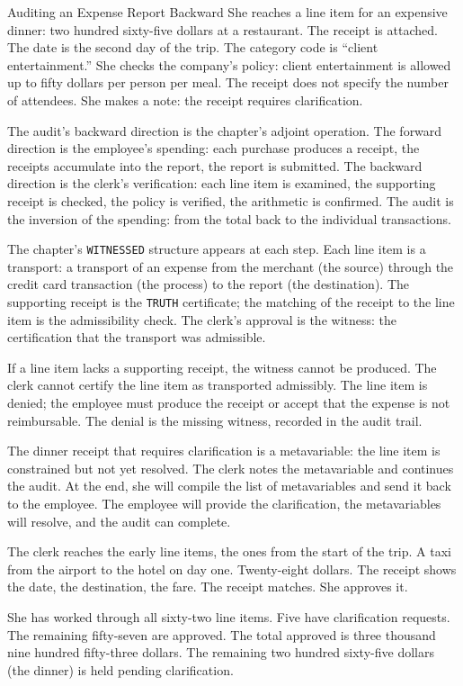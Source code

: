 \begin{coda}{Auditing an Expense Report Backward}
She reaches a line item for an expensive dinner: two hundred
sixty-five dollars at a restaurant. The receipt is attached. The
date is the second day of the trip. The category code is
``client entertainment.'' She checks the company's policy:
client entertainment is allowed up to fifty dollars per person
per meal. The receipt does not specify the number of attendees.
She makes a note: the receipt requires clarification.

The audit's backward direction is the chapter's adjoint
operation. The forward direction is the employee's spending:
each purchase produces a receipt, the receipts accumulate into
the report, the report is submitted. The backward direction is
the clerk's verification: each line item is examined, the
supporting receipt is checked, the policy is verified, the
arithmetic is confirmed. The audit is the inversion of the
spending: from the total back to the individual transactions.

The chapter's \texttt{WITNESSED} structure appears at each step.
Each line item is a transport: a transport of an expense from
the merchant (the source) through the credit card transaction
(the process) to the report (the destination). The supporting
receipt is the \texttt{TRUTH} certificate; the matching of the
receipt to the line item is the admissibility check. The clerk's
approval is the witness: the certification that the transport
was admissible.

If a line item lacks a supporting receipt, the witness cannot be
produced. The clerk cannot certify the line item as transported
admissibly. The line item is denied; the employee must produce
the receipt or accept that the expense is not reimbursable. The
denial is the missing witness, recorded in the audit trail.

The dinner receipt that requires clarification is a metavariable:
the line item is constrained but not yet resolved. The clerk
notes the metavariable and continues the audit. At the end, she
will compile the list of metavariables and send it back to the
employee. The employee will provide the clarification, the
metavariables will resolve, and the audit can complete.

The clerk reaches the early line items, the ones from the start
of the trip. A taxi from the airport to the hotel on day one.
Twenty-eight dollars. The receipt shows the date, the
destination, the fare. The receipt matches. She approves it.

She has worked through all sixty-two line items. Five have
clarification requests. The remaining fifty-seven are approved.
The total approved is three thousand nine hundred fifty-three
dollars. The remaining two hundred sixty-five dollars (the
dinner) is held pending clarification.


\end{coda}

